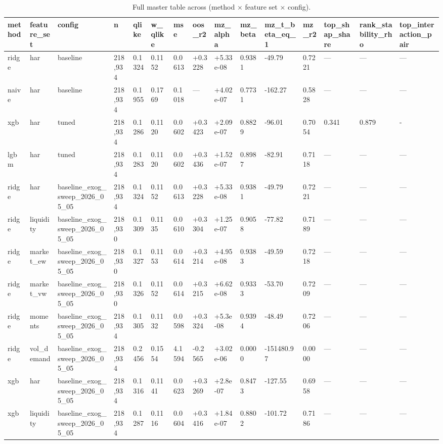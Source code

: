 \begin{table}[t]
\centering
\caption{Full master table across (method × feature set × config).}
\label{tab:master_full}
\begin{tabular}{lllllllllllllll}
\toprule
method & feature\_set & config & n & qlike & w\_qlike & mse & oos\_r2 & mz\_alpha & mz\_beta & mz\_t\_beta\_eq\_1 & mz\_r2 & top\_shap\_share & rank\_stability\_rho & top\_interaction\_pair \\
\midrule
ridge & har & baseline & 218,934 & 0.1324 & 0.1152 & 0.0613 & +0.3228 & +5.33e-08 & 0.9381 & -49.79 & 0.7221 & — & — & — \\
naive & har & baseline & 218,934 & 0.1955 & 0.1769 & 0.1018 & — & +4.02e-07 & 0.7731 & -162.27 & 0.5828 & — & — & — \\
xgb & har & tuned & 218,934 & 0.1286 & 0.1120 & 0.0602 & +0.3423 & +2.09e-07 & 0.8829 & -96.01 & 0.7054 & 0.341 & 0.879 & - \\
lgbm & har & tuned & 218,934 & 0.1283 & 0.1120 & 0.0602 & +0.3436 & +1.52e-07 & 0.8987 & -82.91 & 0.7118 & — & — & — \\
ridge & har & baseline\_exog\_sweep\_2026\_05\_05 & 218,934 & 0.1324 & 0.1152 & 0.0613 & +0.3228 & +5.33e-08 & 0.9381 & -49.79 & 0.7221 & — & — & — \\
ridge & liquidity & baseline\_exog\_sweep\_2026\_05\_05 & 218,930 & 0.1309 & 0.1135 & 0.0610 & +0.3304 & +1.25e-07 & 0.9058 & -77.82 & 0.7189 & — & — & — \\
ridge & market\_ew & baseline\_exog\_sweep\_2026\_05\_05 & 218,930 & 0.1327 & 0.1153 & 0.0614 & +0.3214 & +4.95e-08 & 0.9383 & -49.59 & 0.7218 & — & — & — \\
ridge & market\_vw & baseline\_exog\_sweep\_2026\_05\_05 & 218,930 & 0.1326 & 0.1152 & 0.0614 & +0.3215 & +6.62e-08 & 0.9333 & -53.70 & 0.7209 & — & — & — \\
ridge & moments & baseline\_exog\_sweep\_2026\_05\_05 & 218,934 & 0.1305 & 0.1132 & 0.0598 & +0.3324 & +5.3e-08 & 0.9394 & -48.49 & 0.7206 & — & — & — \\
ridge & vol\_demand & baseline\_exog\_sweep\_2026\_05\_05 & 218,934 & 0.2456 & 0.1554 & 4.1594 & -0.2565 & +3.02e-06 & 0.0000 & -151480.97 & 0.0000 & — & — & — \\
xgb & har & baseline\_exog\_sweep\_2026\_05\_05 & 218,934 & 0.1316 & 0.1141 & 0.0623 & +0.3269 & +2.8e-07 & 0.8473 & -127.55 & 0.6958 & — & — & — \\
xgb & liquidity & baseline\_exog\_sweep\_2026\_05\_05 & 218,934 & 0.1287 & 0.1116 & 0.0604 & +0.3416 & +1.84e-07 & 0.8802 & -101.72 & 0.7186 & — & — & — \\

\end{tabular}
\end{table}
